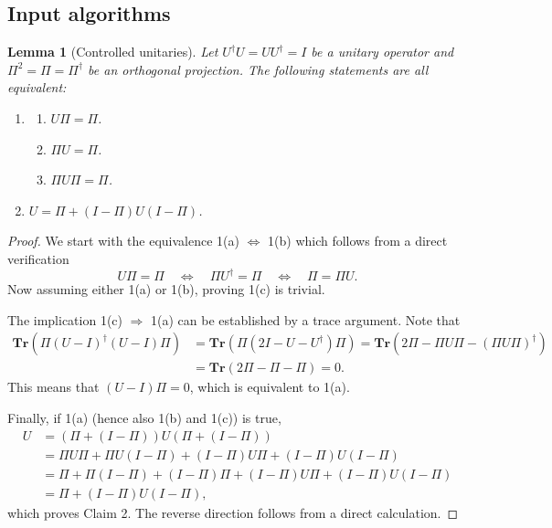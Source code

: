 \documentclass[letterpaper,onecolumn,11pt,accepted=2026-02-14]{quantumarticle}
\newtheorem{lemma}{Lemma}
\theoremstyle{remark}
\theoremstyle{plain}
\begin{document}
\subsection{Input algorithms}
\label{append:axiom_input}

\begin{lemma}[Controlled unitaries]
\label{lem:control_unitary}
    Let $U^\dagger U=UU^\dagger=I$ be a unitary operator and $\Pi^2=\Pi=\Pi^\dagger$ be an orthogonal projection. The following statements are all equivalent:
    \begin{enumerate}
        \item 
        \begin{enumerate}
            \item $U\Pi=\Pi$.
            \item $\Pi U=\Pi$.
            \item $\Pi U\Pi=\Pi$.
        \end{enumerate}
        \item $U=\Pi+(I-\Pi)U(I-\Pi)$.
    \end{enumerate}
\end{lemma}
\begin{proof}
We start with the equivalence 1(a) $\Leftrightarrow$ 1(b) which follows from a direct verification
\begin{equation}
    U\Pi=\Pi
    \quad\Leftrightarrow\quad
    \Pi U^\dagger=\Pi
    \quad\Leftrightarrow\quad
    \Pi=\Pi U.
\end{equation}
Now assuming either 1(a) or 1(b), proving 1(c) is trivial.

The implication 1(c) $\Rightarrow$ 1(a) can be established by a trace argument. Note that
\begin{equation}
\begin{aligned}
    \mathbf{Tr}\left(\Pi(U-I)^\dagger(U-I)\Pi\right)
    &=\mathbf{Tr}\left(\Pi\left(2I-U-U^\dagger\right)\Pi\right)
    =\mathbf{Tr}\left(2\Pi-\Pi U\Pi-\left(\Pi U\Pi\right)^\dagger\right)\\
    &=\mathbf{Tr}\left(2\Pi-\Pi-\Pi\right)
    =0.
\end{aligned}
\end{equation}
This means that $(U-I)\Pi=0$, which is equivalent to 1(a).

Finally, if 1(a) (hence also 1(b) and 1(c)) is true,
\begin{equation}
\begin{aligned}
    U&=\left(\Pi+(I-\Pi)\right)U\left(\Pi+(I-\Pi)\right)\\
    &=\Pi U\Pi+\Pi U(I-\Pi)+(I-\Pi)U\Pi+(I-\Pi)U(I-\Pi)\\
    &=\Pi+\Pi(I-\Pi)+(I-\Pi)\Pi+(I-\Pi)U\Pi+(I-\Pi)U(I-\Pi)\\
    &=\Pi+(I-\Pi)U(I-\Pi),
\end{aligned}
\end{equation}
which proves Claim 2. The reverse direction follows from a direct calculation.
\end{proof}
\end{document}
